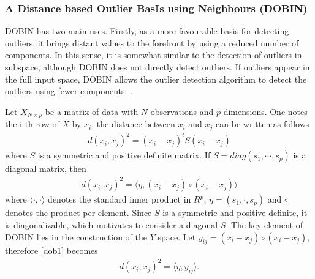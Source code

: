 \subsubsection*{A Distance based Outlier BasIs using Neighbours (DOBIN)}
 DOBIN has two main uses. Firstly, as a more favourable basis for detecting outliers, it brings distant values to the forefront by using a reduced number of components. In this sense, it is somewhat similar to the detection of outliers in subspace, although DOBIN does not directly detect outliers. If outliers appear in the full input space, DOBIN allows the outlier detection algorithm to detect the outliers using fewer components. \cite{A7}.  
 
 Let $X_{N\times p}$ be a matrix of data with $N$ observations and $p$ dimensions. One notes the i-th row of $X$ by $x_i$, the distance between $x_i$ and $x_j$ can be written as follows
 \begin{align*}
 d(x_i,x_j)^2=(x_i-x_j)^tS(x_i-x_j) 
 \end{align*}
 where $S$ is a symmetric and positive definite matrix. If $S=diag(s_1,\cdots,s_p)$ is a diagonal matrix, then
 \begin{align}\label{dob1}
 d(x_i,x_j)^2=\langle\eta,(x_i-x_j)\circ(x_i-x_j) \rangle
 \end{align} 
 where $\langle\cdot{,}\cdot\rangle$ denotes the standard inner product in $R^p$, $\eta = (s_1,\cdot,s_p)$ and $\circ$ denotes the product per element. Since $S$ is a symmetric and positive definite, it is diagonalizable, which motivates to consider a diagonal $S$. The key element of DOBIN lies in the construction of the $Y$ space.
 Let $y_{ij}=(x_i-x_j)\circ(x_i-x_j)$, therefore \eqref{dob1} becomes 
\begin{align}\label{dob2}
d(x_i,x_j)^2=\langle\eta,y_{ij}\rangle.
\end{align}

